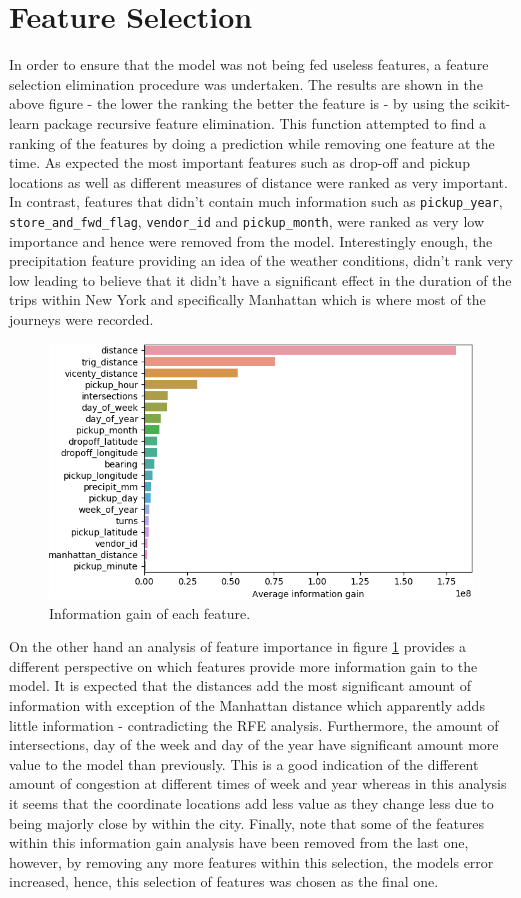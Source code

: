 \documentclass[a4paper]{article}
\begin{document}
\section{Feature Selection}
In order to ensure that the model was not being fed useless features, a feature
selection elimination procedure was undertaken. The results are shown in the
above figure - the lower the ranking the better the feature is - by using the
scikit-learn package recursive feature elimination. This function attempted to
find a ranking of the features by doing a prediction while removing one feature
at the time. As expected the most important features such as drop-off and pickup
locations as well as different measures of distance were ranked as very
important. In contrast,  features that didn’t contain much information such as
\texttt{pickup\_year}, \texttt{store\_and\_fwd\_flag}, \texttt{vendor\_id} and
\texttt{pickup\_month}, were ranked as very low importance and hence were
removed from the model. Interestingly enough, the precipitation feature
providing an idea of the weather conditions, didn’t rank very low leading to
believe that it didn’t have a significant effect in the duration of the trips
within New York and specifically Manhattan which is where most of the journeys
were recorded.

\begin{figure}
    \centering
    \includegraphics[width=0.8\linewidth]{feature_importance_seaborn}
    \caption{Information gain of each feature.}
    \label{information_gain}
\end{figure}

On the other hand an analysis of feature importance in figure \ref{information_gain} provides
a different perspective on which features provide more information gain to the
model. It is expected that the distances add the most significant amount of
information with exception of the Manhattan distance which apparently adds
little information - contradicting the RFE analysis. Furthermore, the amount of
intersections, day of the week and day of the year have significant amount more
value to the model than previously. This is a good indication of the different
amount of congestion at different times of week and year whereas in this
analysis it seems that the coordinate locations add less value as they change
less due to being majorly close by within the city. Finally, note that some of
the features within this information gain analysis have been removed from the
last one, however, by removing any more features within this selection, the
models error increased, hence, this selection of features was chosen as the
final one.
\end{document}
